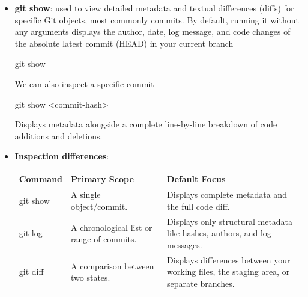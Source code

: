 \documentclass{report}
\begin{document}
\begin{itemize}
\begin{enumerate}
                \item \textbf{Cleans up other internal metadata}: It may also prune old reflog entries, repack objects, clean redundant packfiles, and optimize internal repository storage.
            \end{enumerate}
            \texttt{git prune} is more specific. It removes \textbf{unreachable loose objects} from the object database 
            \bigbreak \noindent 
            \begin{bashcode}
                git prune
            \end{bashcode}
            \bigbreak \noindent 
            An object is unreachable if no reference path leads to it. For example, if no branch, tag, commit, index entry, stash, or reflog points to it, Git may consider it garbage.
        \item \textbf{git show}: used to view detailed metadata and textual differences (diffs) for specific Git objects, most commonly commits. By default, running it without any arguments displays the author, date, log message, and code changes of the absolute latest commit (HEAD) in your current branch
            \bigbreak \noindent 
            \begin{bashcode}
            git show
            \end{bashcode}
            \bigbreak \noindent 
            We can also inspect a specific commit
            \bigbreak \noindent 
            \begin{bashcode}
            git show <commit-hash>
            \end{bashcode}
            \bigbreak \noindent 
            Displays metadata alongside a complete line-by-line breakdown of code additions and deletions.
        \item \textbf{Inspection differences}: 
            \begin{center}
                \begin{tabularx}{\textwidth}{@{}lXX@{}}
                    \toprule
                    \textbf{Command}& \textbf{Primary Scope} &\textbf{Default Focus} \\
                    \midrule
                    git show &A single object/commit. &Displays complete metadata and the full code diff.\\[2ex]
                    git log &A chronological list or range of commits. &Displays only structural metadata like hashes, authors, and log messages.\\[2ex]
                    git diff &A comparison between two states. &Displays differences between your working files, the staging area, or separate branches. \\
                    \bottomrule
                \end{tabularx}
            \end{center}


\end{itemize}
\end{document}

